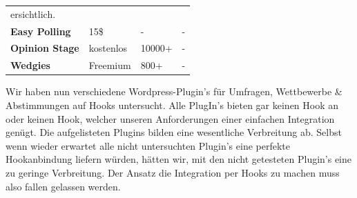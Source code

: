 \begin{longtable}[c]{@{}llll@{}}
\begin{minipage}[t]{0.28\columnwidth}
ersichtlich.
\strut\end{minipage}\tabularnewline
\begin{minipage}[t]{0.33\columnwidth}\raggedright\strut
\textbf{Easy Polling}
\strut\end{minipage} &
\begin{minipage}[t]{0.14\columnwidth}\raggedright\strut
15\$
\strut\end{minipage} &
\begin{minipage}[t]{0.14\columnwidth}\raggedright\strut
-
\strut\end{minipage} &
\begin{minipage}[t]{0.28\columnwidth}\raggedright\strut
-
\strut\end{minipage}\tabularnewline
\begin{minipage}[t]{0.33\columnwidth}\raggedright\strut
\textbf{Opinion Stage}
\strut\end{minipage} &
\begin{minipage}[t]{0.14\columnwidth}\raggedright\strut
kostenlos
\strut\end{minipage} &
\begin{minipage}[t]{0.14\columnwidth}\raggedright\strut
10000+
\strut\end{minipage} &
\begin{minipage}[t]{0.28\columnwidth}\raggedright\strut
-
\strut\end{minipage}\tabularnewline
\begin{minipage}[t]{0.33\columnwidth}\raggedright\strut
\textbf{Wedgies}
\strut\end{minipage} &
\begin{minipage}[t]{0.14\columnwidth}\raggedright\strut
Freemium
\strut\end{minipage} &
\begin{minipage}[t]{0.14\columnwidth}\raggedright\strut
800+
\strut\end{minipage} &
\begin{minipage}[t]{0.28\columnwidth}\raggedright\strut
-
\strut\end{minipage}\tabularnewline
\bottomrule
\end{longtable}

Wir haben nun verschiedene Wordpress-Plugin's für Umfragen, Wettbewerbe
\& Abstimmungen auf Hooks untersucht. Alle PlugIn's bieten gar keinen
Hook an oder keinen Hook, welcher unseren Anforderungen einer einfachen
Integration genügt. Die aufgelisteten Plugins bilden eine wesentliche
Verbreitung ab. Selbst wenn wieder erwartet alle nicht untersuchten
Plugin's eine perfekte Hookanbindung liefern würden, hätten wir, mit den
nicht getesteten Plugin's eine zu geringe Verbreitung. Der Ansatz die
Integration per Hooks zu machen muss also fallen gelassen werden.

